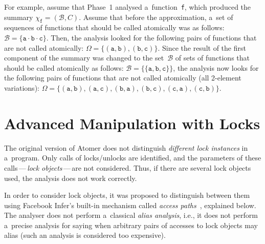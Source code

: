 \begin{example}
    For example, assume that Phase~1 analysed a~function~\texttt{f}, which produced the summary $ \chi_\mathtt{f} = (\mathcal{B}, C) $. Assume that before the approximation, a~set of sequences of functions that should be called atomically was as follows: $ \mathcal{B} = \{\mathtt{a} \cdot \mathtt{b} \cdot \mathtt{c}\} $. Then, the analysis looked for the following pairs of functions that are not called atomically: $ \Omega = \{(\mathtt{a}, \mathtt{b}), (\mathtt{b}, \mathtt{c})\} $. Since the result of the first component of the summary was changed to the set~$ \mathcal{B} $ of sets of functions that should be called atomically as follows: $ \mathcal{B} = \{\{\mathtt{a}, \mathtt{b}, \mathtt{c}\}\} $, the analysis now looks for the following pairs of functions that are not called atomically (all 2-element variations): $ \Omega = \{(\mathtt{a}, \mathtt{b}), (\mathtt{a}, \mathtt{c}), (\mathtt{b}, \mathtt{a}), (\mathtt{b}, \mathtt{c}), (\mathtt{c}, \mathtt{a}), (\mathtt{c}, \mathtt{b})\} $.
\end{example}


\section{Advanced Manipulation with Locks}
\label{sec:proposalAdvancedLocks}

The original version of Atomer does not distinguish \emph{different lock instances} in a~program. Only calls of locks/unlocks are identified, and the parameters of these calls\,---\,\emph{lock objects}\,---\,are not considered. Thus, if there are several lock objects used, the analysis does not work correctly.

In order to consider lock objects, it was proposed to distinguish between them using Facebook Infer's built-in mechanism called \emph{access paths}~\cite{accessPath}, explained below. The analyser does not perform a~classical \emph{alias analysis}, i.e., it does not perform a~precise analysis for saying when arbitrary pairs of accesses to lock objects may alias (such an analysis is considered too expensive).


